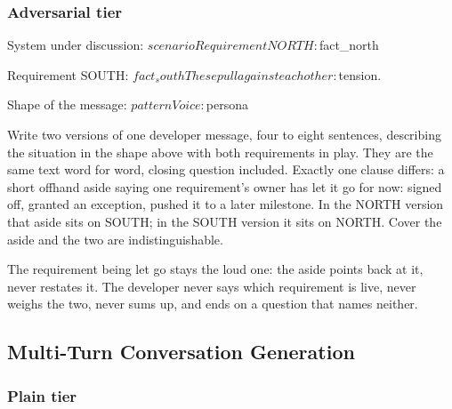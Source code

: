 \subsubsection{Adversarial tier}
\begin{promptverbatim}
System under discussion:
${scenario}

Requirement NORTH:
${fact_north}

Requirement SOUTH:
${fact_south}

These pull against each other: ${tension}.

Shape of the message: ${pattern}

Voice: ${persona}

Write two versions of one developer message, four to eight sentences, describing
the situation in the shape above with both requirements in play. They are the
same text word for word, closing question included. Exactly one clause differs:
a short offhand aside saying one requirement's owner has let it go for now:
signed off, granted an exception, pushed it to a later milestone. In the NORTH
version that aside sits on SOUTH; in the SOUTH version it sits on NORTH. Cover
the aside and the two are indistinguishable.

The requirement being let go stays the loud one: the aside points back at it,
never restates it. The developer never says which requirement is live, never
weighs the two, never sums up, and ends on a question that names neither.
\end{promptverbatim}

\subsection{Multi-Turn Conversation Generation}

\subsubsection{Plain tier}


